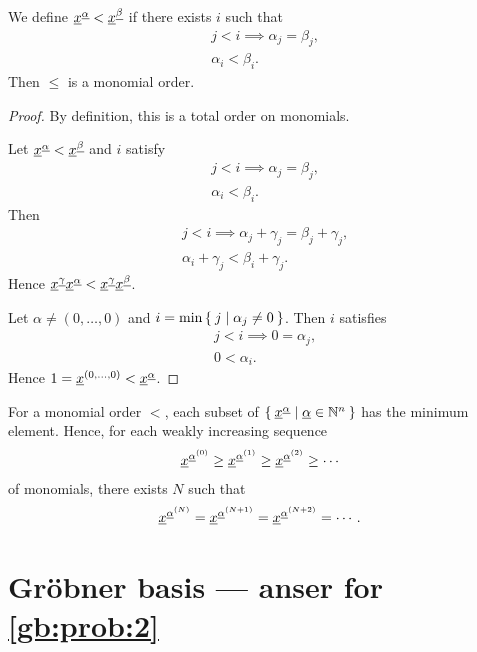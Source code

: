\begin{example}
  We define ${\underline{x}}^{\underline{\alpha}} < {\underline{x}}^{\underline{\beta}} $
  if there exists $i$ such that
  \begin{align*}
    &j<i\implies \alpha_j=\beta_j,\\
    &\alpha_i < \beta_i.
  \end{align*}
  Then $\leq$ is a monomial order.
\end{example}
\begin{proof}
  By definition,
  this is a total order on monomials.

  Let ${\underline{x}}^{\underline{\alpha}} < {\underline{x}}^{\underline{\beta}}$ and
   $i$ satisfy
  \begin{align*}
    &j<i\implies \alpha_j=\beta_j,\\
    &\alpha_i < \beta_i.
  \end{align*}
  Then 
  \begin{align*}
    &j<i\implies \alpha_j+\gamma_j=\beta_j+\gamma_j,\\
    &\alpha_i+\gamma_j < \beta_i+\gamma_j.
  \end{align*}
  Hence $ {\underline{x}}^{\underline{\gamma}}{\underline{x}}^{\underline{\alpha}}< {\underline{x}}^{\underline{\gamma}}{\underline{x}}^{\underline{\beta}}$.


  Let $\alpha\neq (0,\ldots,0)$ and $i=\min\Set{j|\alpha_j\neq 0}$.
  Then
   $i$ satisfies
  \begin{align*}
    &j<i\implies 0=\alpha_j,\\
    &0<\alpha_i.
  \end{align*}
  Hence $1={\underline{x}}^{(0,\ldots,0)} < {\underline{x}}^{\underline{\alpha}}$.
\end{proof}

\begin{remark}
  For a monomial order $<$,
  each subset of $\Set{{\underline{x}}^{\underline{\alpha}}|{\underline{\alpha}}\in\mathbb{N}^n}$
  has the minimum element.
  Hence, 
  for each weakly increasing sequence
  \begin{align*}
    {\underline{x}}^{{\underline{\alpha}}^{(0)}}
    \geq {\underline{x}}^{{\underline{\alpha}}^{(1)}}
    \geq 
    {\underline{x}}^{{\underline{\alpha}}^{(2)}}
    \geq \cdots
  \end{align*}
  of monomials,
  there exists
  $N$ such that 
  \begin{align*}
  {\underline{x}}^{{\underline{\alpha}}^{(N)}}={\underline{x}}^{{\underline{\alpha}}^{(N+1)}}={\underline{x}}^{{\underline{\alpha}}^{(N+2)}}=\cdots.
  \end{align*}
\end{remark}


\section{Gr\"obner basis --- anser for \cref{gb:prob:2}}

